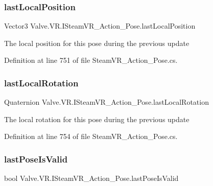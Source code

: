 \subsubsection{\texorpdfstring{lastLocalPosition}{lastLocalPosition}}
{\footnotesize\ttfamily Vector3 Valve.\+V\+R.\+I\+Steam\+V\+R\+\_\+\+Action\+\_\+\+Pose.\+last\+Local\+Position\hspace{0.3cm}{\ttfamily [get]}}



The local position for this pose during the previous update 



Definition at line 751 of file Steam\+V\+R\+\_\+\+Action\+\_\+\+Pose.\+cs.

\mbox{\label{interface_valve_1_1_v_r_1_1_i_steam_v_r___action___pose_aa132a0b4f55cd4b11a6ca99965835343}} 
\subsubsection{\texorpdfstring{lastLocalRotation}{lastLocalRotation}}
{\footnotesize\ttfamily Quaternion Valve.\+V\+R.\+I\+Steam\+V\+R\+\_\+\+Action\+\_\+\+Pose.\+last\+Local\+Rotation\hspace{0.3cm}{\ttfamily [get]}}



The local rotation for this pose during the previous update 



Definition at line 754 of file Steam\+V\+R\+\_\+\+Action\+\_\+\+Pose.\+cs.

\mbox{\label{interface_valve_1_1_v_r_1_1_i_steam_v_r___action___pose_a710f0141d26fe73390796c725474d214}} 
\subsubsection{\texorpdfstring{lastPoseIsValid}{lastPoseIsValid}}
{\footnotesize\ttfamily bool Valve.\+V\+R.\+I\+Steam\+V\+R\+\_\+\+Action\+\_\+\+Pose.\+last\+Pose\+Is\+Valid\hspace{0.3cm}{\ttfamily [get]}}




